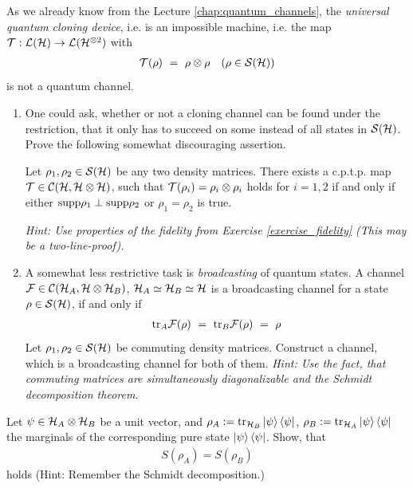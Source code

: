 \begin{exercise}[No Cloning]
	 As we already know from the Lecture \ref{chap:quantum_channels}, the \emph{universal quantum cloning device}, i.e. is an impossible machine, i.e. the map ${\mathcal T}: {\mathcal L}({\mathcal H}) \rightarrow {\mathcal L}({\mathcal H}^{\otimes 2})$ with
	 \begin{align}
	 {\mathcal T}(\rho) \ = \ \rho \otimes \rho &&(\rho \in {\mathcal S}({\mathcal H}))
	 \end{align} 
	 is not a quantum channel. 
	 \begin{enumerate}
	 	\item One could ask, whether or not a cloning channel can be found under the restriction, that it only has to succeed on some instead of all states in ${\mathcal S}({\mathcal H})$. \newline 
	 	Prove the following somewhat discouraging assertion.
	 	\begin{theorem} 
	 		Let $\rho_1, \rho_2 \in {\mathcal S}({\mathcal H})$ be any two density matrices. There exists a c.p.t.p. map ${\mathcal T} \in {\mathcal C}({\mathcal H}, {\mathcal H} \otimes {\mathcal H})$, such that ${\mathcal T}(\rho_i) = \rho_i \otimes \rho_i$ holds for $i = 1,2$ if and only if either $\mathrm{supp} \rho_1 \perp \mathrm{supp} \rho_2$ or $\rho_1 = \rho_2$ is true. 
	 	\end{theorem} 
	 	\emph{Hint: Use properties of the fidelity from Exercise \ref{exercise_fidelity} (This may be a two-line-proof).}
	 	\item A somewhat less restrictive task is \emph{broadcasting} of quantum states. A channel ${\mathcal F} \in {\mathcal C}({\mathcal H}_A, {\mathcal H} \otimes {\mathcal H}_B)$, ${\mathcal H}_A \simeq {\mathcal H}_B \simeq {\mathcal H}$ is a broadcasting channel for a state $\rho \in {\mathcal S}({\mathcal H})$, if and only if 
	 	\begin{align}
	 	\mathrm{tr}_A {\mathcal F}(\rho) \ = \ \mathrm{tr}_B {\mathcal F}(\rho) \ = \ \rho
	 	\end{align}
	 	Let $\rho_1, \rho_2 \in {\mathcal S}({\mathcal H})$ be commuting density matrices. Construct a channel, which is a broadcasting channel for both of them. \newline 
	 	\emph{Hint: Use the fact, that commuting matrices are simultaneously diagonalizable and the Schmidt decomposition theorem.} 
	 \end{enumerate} 
\end{exercise}
\begin{exercise}
 Let $\psi \in {\mathcal H}_A \otimes {\mathcal H}_B$ be a unit vector, and $\rho_A := \mathrm{tr}_{{\mathcal H}_B} \ket{\psi}\bra{\psi}$, 
 $\rho_B := \mathrm{tr}_{{\mathcal H}_A} \ket{\psi}\bra{\psi}$ the marginals of the corresponding pure state $\ket{\psi}\bra{\psi}$. Show, 
 that
 \begin{align}
  S(\rho_A) = S(\rho_B)
 \end{align}
 holds (Hint: Remember the Schmidt decomposition.)
\end{exercise}


